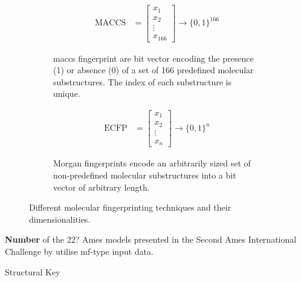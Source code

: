 \begin{figure}[H]
    \centering
    \begin{subfigure}[t]{0.48\textwidth}
        \centering
        \begin{align*}
            \text{MACCS} &= \begin{bmatrix}
               x_{1} \\
               x_{2} \\
               \vdots \\
               x_{166}
             \end{bmatrix}
            \rightarrow \{0, 1\}^{166}
        \end{align*}
        \caption{\gls{maccs} fingerprint are bit vector encoding the presence (1) or absence (0) of a set of 166 predefined molecular substructures. The index of each substructure is unique.}
        \label{fig:maccs}
    \end{subfigure}
    \hfill
    \begin{subfigure}[t]{0.48\textwidth}
        \centering
        \begin{align*}
            \text{ECFP} &= \begin{bmatrix}
               x_{1} \\
               x_{2} \\
               \vdots \\
               x_{n}
             \end{bmatrix}
            \rightarrow \{0, 1\}^n
        \end{align*}
        \caption{Morgan fingerprints encode an arbitrarily sized set of non-predefined molecular substructures into a bit vector of arbitrary length.}
        \label{fig:morgan}
    \end{subfigure}
    \caption{Different molecular fingerprinting techniques and their dimensionalities.}
\end{figure}

\textbf{Number} of the 22? Ames models presented in the Second Ames International Challenge by \textcite{furuhama_evaluation_2023} utilise \gls{mf}-type input data.



Structural Key
